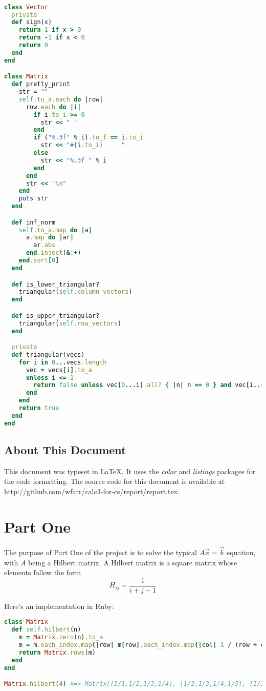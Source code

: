 \documentclass[letterpaper,11pt]{article}
\begin{document}
\lstset{caption=Common Code for All Three Parts}
\begin{lstlisting}[language=ruby]

class Vector
  private
  def sign(x)
    return 1 if x > 0
    return -1 if x < 0
    return 0
  end
end

class Matrix
  def pretty_print
    str = ""
    self.to_a.each do |row|
      row.each do |i|
        if i.to_i >= 0
          str << " "
        end
        if ("%.3f" % i).to_f == i.to_i
          str << "#{i.to_i}     "
        else
          str << "%.3f " % i
        end
      end
      str << "\n"
    end
    puts str
  end

  def inf_norm
    self.to_a.map do |a|
      a.map do |ar|
        ar.abs
      end.inject(&:+)
    end.sort[0]
  end

  def is_lower_triangular?
    triangular(self.column_vectors)
  end

  def is_upper_triangular?
    triangular(self.row_vectors)
  end

  private
  def triangular(vecs)
    for i in 0...vecs.length
      vec = vecs[i].to_a
      unless i <= 1
        return false unless vec[0...i].all? { |n| n == 0 } and vec[i..-1].all? { |n| n != 0 }
      end
    end
    return true
  end
end
\end{lstlisting}

\subsection{About This Document}

This document was typeset in \LaTeX.
It uses the \textit{color} and \textit{listings} packages for the code formatting.
The source code for this document is available at http://github.com/wfarr/calc3-for-cs/report/report.tex.

\newpage
\section{Part One}

The purpose of Part One of the project is to solve the typical $A\vec{x} = \vec{b}$ equation, with $A$ being a Hilbert matrix.
A Hilbert matrix is a square matrix whose elements follow the form $$H_{ij} = \frac{1}{i + j - 1}$$

Here's an implementation in Ruby:

\lstset{caption=Hilbert Matrix Implementation}
\begin{lstlisting}[language=ruby]
class Matrix
  def self.hilbert(n)
    m = Matrix.zero(n).to_a
    m = m.each_index.map{|row| m[row].each_index.map{|col| 1 / (row + col + 1)}}
    return Matrix.rows(m)
  end
end

Matrix.hilbert(4) #=> Matrix[[1/1,1/2,1/3,1/4], [1/2,1/3,1/4,1/5], [1/3,1/4,1/5,1/6], [1/4,1/5,1/6,1/7]]
\end{lstlisting}
\end{document}
